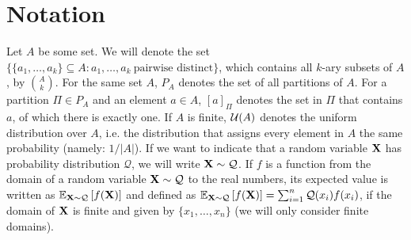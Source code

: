 
\section{Notation}
Let $A$ be some set. We will denote the set $\{ \{ a_1, \dots, a_k \} \subseteq A : a_1,\dots,a_k\ \text{pairwise distinct}\}$, which contains all $k$-ary subsets of $A$, by $\binom{A}{k}$. For the same set $A$, $P_A$ denotes the set of all partitions of $A$. For a partition $\Pi \in P_A$ and an element $a \in A$, $[a]_\Pi$ denotes the set in $\Pi$ that contains $a$, of which there is exactly one. If $A$ is finite, $\mathcal{U}(A)$ denotes the uniform distribution over $A$, i.e. the distribution that assigns every element in $A$ the same probability (namely: $1/|A|$). If we want to indicate that a random variable ${\bf X}$ has probability distribution $\mathcal{Q}$, we will write ${\bf X} \sim \mathcal{Q}$. If $f$ is a function from the domain of a random variable ${\bf X} \sim \mathcal{Q}$ to the real numbers, its expected value is written as $\mathbb{E}_{{\bf X} \sim \mathcal{Q}}\left[f({\bf X})\right]$ and defined as $\mathbb{E}_{{\bf X} \sim \mathcal{Q}} \left[f({\bf X})\right] = \sum_{i=1}^n \mathcal{Q}(x_i) f(x_i)$, if the domain of ${\bf X}$ is finite and given by $\{x_1,\dots,x_n\}$ (we will only consider finite domains).


